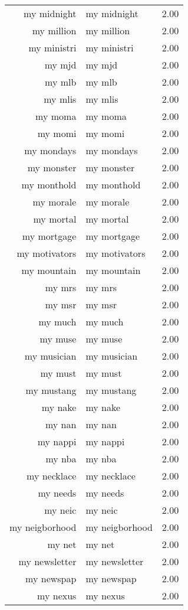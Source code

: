 \begin{table}[ht]
\begin{tabular}{rlr}
  my midnight & my midnight & 2.00 \\ 
  my million & my million & 2.00 \\ 
  my ministri & my ministri & 2.00 \\ 
  my mjd & my mjd & 2.00 \\ 
  my mlb & my mlb & 2.00 \\ 
  my mlis & my mlis & 2.00 \\ 
  my moma & my moma & 2.00 \\ 
  my momi & my momi & 2.00 \\ 
  my mondays & my mondays & 2.00 \\ 
  my monster & my monster & 2.00 \\ 
  my monthold & my monthold & 2.00 \\ 
  my morale & my morale & 2.00 \\ 
  my mortal & my mortal & 2.00 \\ 
  my mortgage & my mortgage & 2.00 \\ 
  my motivators & my motivators & 2.00 \\ 
  my mountain & my mountain & 2.00 \\ 
  my mrs & my mrs & 2.00 \\ 
  my msr & my msr & 2.00 \\ 
  my much & my much & 2.00 \\ 
  my muse & my muse & 2.00 \\ 
  my musician & my musician & 2.00 \\ 
  my must & my must & 2.00 \\ 
  my mustang & my mustang & 2.00 \\ 
  my nake & my nake & 2.00 \\ 
  my nan & my nan & 2.00 \\ 
  my nappi & my nappi & 2.00 \\ 
  my nba & my nba & 2.00 \\ 
  my necklace & my necklace & 2.00 \\ 
  my needs & my needs & 2.00 \\ 
  my neic & my neic & 2.00 \\ 
  my neigborhood & my neigborhood & 2.00 \\ 
  my net & my net & 2.00 \\ 
  my newsletter & my newsletter & 2.00 \\ 
  my newspap & my newspap & 2.00 \\ 
  my nexus & my nexus & 2.00 \\ 

\end{tabular}
\end{table}
